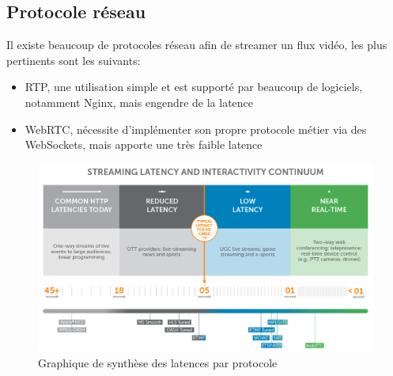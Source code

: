 \documentclass[12pt, a4paper]{report}
\begin{document}
\subsection{Protocole réseau}
Il existe beaucoup de protocoles réseau afin de streamer un flux vidéo, les plus pertinents sont les suivants:\newline
\begin{itemize}
    \item RTP, une utilisation simple et est supporté par beaucoup de logiciels, notamment Nginx, mais engendre de la latence\newline
    \item WebRTC, nécessite d'implémenter son propre protocole métier via des WebSockets, mais apporte une très faible latence\newline
\end{itemize}
\begin{figure}[H]
    \centering
    \includegraphics[width=1.0\textwidth]{realtime-protocols.png}
    \caption{Graphique de synthèse des latences par protocole}
\end{figure}
\end{document}
